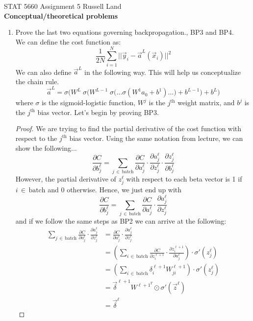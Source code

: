 \documentclass[12pt,letterpaper]{article}
\begin{document}
\noindent STAT 5660 Assignment 5 \hfill Russell Land\\[3mm]
{\bf Conceptual/theoretical problems}

\begin{enumerate}
\item Prove the last two equations governing backpropagation., BP3 and BP4.\\[3mm]
We can define the cost function as: $$\frac{1}{2N}\sum_{i=1}^N||\vec{y}_i-\vec{a}^L(\vec{x}_i)||^2$$ We can also define $\vec{a}^L$ in the following way. This will help us conceptualize the chain rule. $$\vec{a}^L=\sigma\bigg(W^L\;\sigma\Big(W^{L-1}\;\sigma\big(\ldots\sigma( W^1a_0+b^1)\ldots\big)+b^{L-1}\Big)+b^L\bigg)$$ where $\sigma$ is the sigmoid-logistic function, $W^j$ is the $j^{\text{th}}$ weight matrix, and $b^j$ is the $j^{\text{th}}$ bias vector. Let's begin by proving BP3.
\begin{proof}
We are trying to find the partial derivative of the cost function with respect to the $j^{\text{th}}$ bias vector. Using the same notation from lecture, we can show the following... $$\frac{\partial C}{\partial b_j^{\ell}}=\sum_{j\,\in\,\text{batch}}\frac{\partial C}{\partial a_j^{\ell}}\cdot\frac{\partial a_j^{\ell}}{\partial z_j^{\ell}}\cdot\frac{\partial z_j^{\ell}}{\partial b_j^{\ell}}$$ However, the partial derivative of $z_j^{\ell}$ with respect to each beta vector is 1 if $i\,\in\,\text{batch}$ and 0 otherwise. Hence, we just end up with $$\frac{\partial C}{\partial b_j^{\ell}}=\sum_{j\,\in\,\text{batch}}\frac{\partial C}{\partial a_j^{\ell}}\cdot\frac{\partial a_j^{\ell}}{\partial z_j^{\ell}}$$ and if we follow the same steps as BP2 we can arrive at the following:
\begin{align*}
	\sum_{j\,\in\,\text{batch}}\frac{\partial C}{\partial a_j^{\ell}}\cdot\frac{\partial a_j^{\ell}}{\partial z_j^{\ell}}&=\frac{\partial C}{\partial a_j^{\ell}}\cdot\frac{\partial a_j^{\ell}}{\partial z_j^{\ell}}\\
	&=\left(\sum_{i\,\in\,\text{batch}}\frac{\partial C}{\partial z_i^{\ell+1}}\cdot\frac{\partial z_i^{\ell+1}}{\partial a_j^{\ell}}\right)\cdot \sigma'\left(z_j^{\ell}\right)\\
	&=\left(\sum_{i\,\in\,\text{batch}}\delta_i^{\ell+1}W_{ji}^{\ell+1}\right)\cdot\sigma'\left(z_j^{\ell}\right)\\
	&=\vec{\delta}^{\ell+1}W^{{\ell+1}^T}\odot\sigma'\left(\vec{z}^{\ell}\right)\\
	&=\vec{\delta}^{\ell}
\end{align*}

\end{proof}
\end{enumerate}
\end{document}
